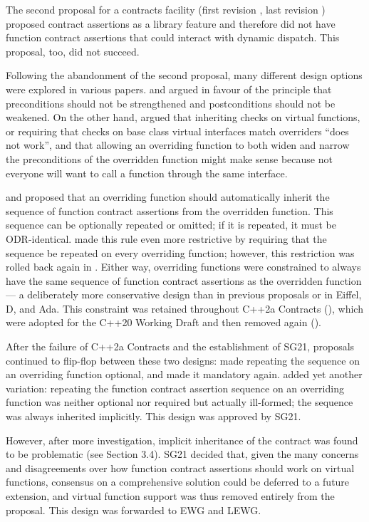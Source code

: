 The second proposal for a contracts facility (first revision \cite{N3604}, last revision \cite{N4378}) proposed contract assertions as a library feature and therefore did not have function contract assertions that could interact with dynamic dispatch. This proposal, too, did not succeed.

Following the abandonment of the second proposal, many different design options were explored in various papers. \cite{N4110} and \cite{P0147R0} argued in favour of the principle that preconditions should not be strengthened and postconditions should not be weakened. On the other hand, \cite{P0247R0} argued that inheriting checks on virtual functions, or requiring that checks on base class virtual interfaces match overriders ``does not work'', and that allowing an overriding function to both widen and narrow the preconditions of the overridden function might make sense because not everyone will want to call a function through the same interface.

\cite{N4415} and \cite{P0287R0} proposed that an overriding function should automatically inherit the
sequence of function contract assertions from the overridden function. This sequence can be
optionally repeated or omitted; if it is repeated, it must be ODR-identical. \cite{P0380R0} made this rule even more restrictive by requiring that the sequence be repeated on every overriding function; however, this restriction was rolled back again in \cite{P0380R1}. Either way, overriding functions were constrained to always have the same sequence of function contract assertions as the overridden function --- a deliberately more conservative design than in previous proposals or in Eiffel, D, and Ada. This constraint was retained throughout C++2a Contracts (\cite{P0542R5}), which were adopted for the C++20 Working Draft and then removed again (\cite{P1823R0}).

After the failure of C++2a Contracts and the establishment of SG21, proposals continued to flip-flop between these two designs: \cite{P2388R4} made repeating the sequence on an overriding function optional, and \cite{P2521R5} made it mandatory again. \cite{P2954R0} added yet another variation: repeating the function contract assertion sequence on an overriding function was neither optional nor required but actually ill-formed; the sequence was always inherited implicitly. This design was approved by SG21.

However, after more investigation, implicit inheritance of the contract was found to be problematic (see \cite{P2932R3} Section 3.4). SG21 decided that, given the many concerns and disagreements over how function contract assertions should work on virtual functions, consensus on a comprehensive
solution could be deferred to a future extension, and virtual function support was thus removed
entirely from the proposal. This design was forwarded to EWG and LEWG.

